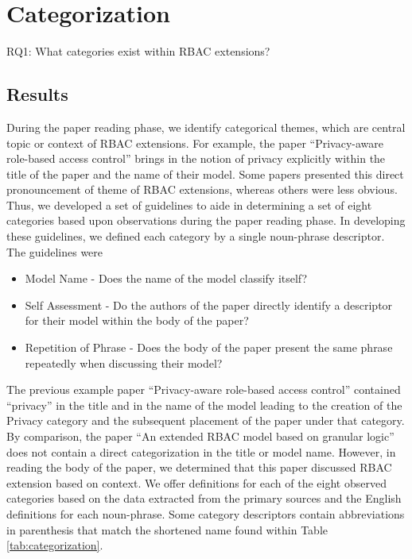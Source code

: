 \section{Categorization} \label{sec:categorization}

RQ1: What categories exist within RBAC extensions?

\subsection{Results}


During the paper reading phase, we identify categorical themes, which are
central topic or context of RBAC extensions. 
For example, the paper ``Privacy-aware role-based access control'' \cite{ni2010privacy} brings in the notion of privacy explicitly within the title of the paper and the name of their model. 
Some papers presented this direct pronouncement of theme of RBAC extensions, whereas others were less obvious. 
Thus, we developed a set of guidelines to aide in determining a set of eight categories based upon observations during the paper reading phase. 
In developing these guidelines, we defined each category by a single noun-phrase descriptor.
The guidelines were

\begin{itemize}
\item Model Name - Does the name of the model classify itself?
\item Self Assessment - Do the authors of the paper directly identify a descriptor for their model within the body of the paper?
\item Repetition of Phrase - Does the body of the paper present the same phrase repeatedly when discussing their model?
\end{itemize}

The previous example paper ``Privacy-aware role-based access control'' \cite{ni2010privacy} contained ``privacy'' in
the title and in the name of the model leading to the creation of the Privacy category and the subsequent placement of the paper under that category.
By comparison, the paper ``An extended RBAC model based on granular logic'' \cite{jian2008extended} does not contain a direct categorization in the title or model name. However, in reading the body of the paper, we determined that this paper discussed RBAC extension based on context. 
We offer definitions for each of the eight observed categories based on the data extracted from the primary sources and the English definitions for each noun-phrase. 
Some category descriptors contain abbreviations in parenthesis that match the shortened name found within Table \ref{tab:categorization}.

